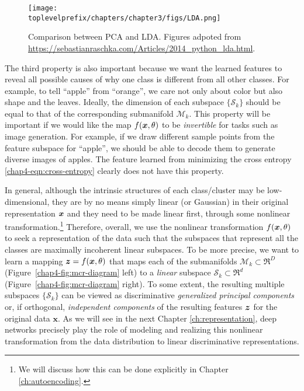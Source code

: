 \documentclass[../../book-main.tex]{subfiles}
\begin{document}
\begin{figure}
	\centering
	\texttt{[image: \\toplevelprefix/chapters/chapter3/figs/LDA.png]}\vspace{-0.1in}
	\caption{Comparison between PCA and LDA. Figures adpoted from \url{https://sebastianraschka.com/Articles/2014_python_lda.html}.}
	\label{fig:LDA}
\end{figure}


The third property is also important because we want the learned features to reveal all possible causes of why one class is different from all other classes. For example, to tell ``apple'' from ``orange'', we care not only about color but also shape and the leaves. Ideally, the dimension of each subspace $\{\mathcal{S}_k\}$ should be equal to that of the corresponding submanifold $\mathcal{M}_k$. This property will be important if we would like the map $f(\bm{x},\theta)$ to be {\em invertible} for tasks such as image generation. For example, if we draw different sample points from the feature subspace for ``apple'', we should be able to decode them to generate diverse images of apples. The feature learned from minimizing the cross entropy \eqref{chap4-eqn:cross-entropy} clearly does not have this property.


In general, although the intrinsic structures of each class/cluster may be low-dimensional, they are by no means simply linear (or Gaussian) in their original representation $\bm{x}$ and they need to be made linear first, through some nonlinear transformation.\footnote{We will discuss how this can be done explicitly in Chapter \ref{ch:autoencoding}.} Therefore, overall, we use the nonlinear transformation $f(\bm{x},\theta)$ to seek a representation of the data such that the subspaces that represent all the classes are maximally incoherent linear subspaces. To be more precise, we want to learn a mapping {$\bm{z} = f(\bm{x},\theta)$} that maps each of the submanifolds $\mathcal{M}_k \subset \Re^D$ (Figure~\ref{chap4-fig:mcr-diagram} left) to a {\em linear} subspace $\mathcal{S}_k \subset \Re^d$ (Figure~\ref{chap4-fig:mcr-diagram} right). To some extent, the resulting multiple subspaces $\{\mathcal{S}_k\}$ can be viewed as discriminative {\em generalized principal components} \cite{GPCA} or, if orthogonal, {\em independent components} \cite{hyvarinen2000independent} of the resulting features $\bm{z}$ for the original data $\bm x$.
As we will see in the next Chapter \ref{ch:representation}, deep networks precisely play the role of modeling and realizing this nonlinear transformation from the data distribution to linear discriminative representations.
\end{document}
